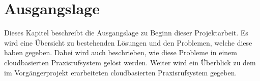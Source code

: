 \section{Ausgangslage}

Dieses Kapitel beschreibt die Ausgangslage zu Beginn dieser Projektarbeit.
Es wird eine Übersicht zu bestehenden Lösungen und den Problemen, welche diese haben gegeben.
Dabei wird auch beschrieben, wie diese Probleme in einem cloudbasierten Praxisrufsystem gelöst werden.
Weiter wird ein Überblick zu dem im Vorgängerprojekt erarbeiteten cloudbasierten Praxisrufsystem gegeben.




\clearpage

